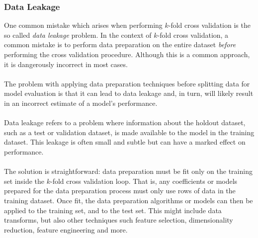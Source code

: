 \subsubsection{Data Leakage}
One common mistake which arises when performing $k$-fold cross validation is the so called \textit{data leakage} problem. In the context of $k$-fold cross validation, a common mistake is to perform data preparation on the entire dataset \textit{before} performing the cross validation procedure. Although this is a common approach, it is dangerously incorrect in most cases. 
\\\\
The problem with applying data preparation techniques before splitting data for model evaluation is that it can lead to data leakage and, in turn, will likely result in an incorrect estimate of a model’s performance.\\\\
Data leakage refers to a problem where information about the holdout dataset, such as a test or validation dataset, is made available to the model in the training dataset. This leakage is often small and subtle but can have a marked effect on performance.\\\\
The solution is straightforward: data preparation must be fit only on the training set inside the $k$-fold cross validation loop. That is, any coefficients or models prepared for the data preparation process must only use rows of data in the training dataset. Once fit, the data preparation algorithms or models can then be applied to the training set, and to the test set. This might include data transforms, but also other techniques such feature selection, dimensionality reduction, feature engineering and more. 
